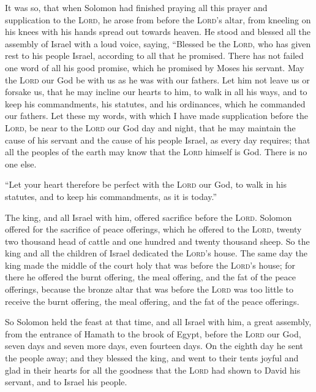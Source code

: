  It was so, that when Solomon had finished praying all
this prayer and supplication to the \textsc{Lord}, he arose from before
the \textsc{Lord}'s altar, from kneeling on his knees with his hands
spread out towards heaven.  He stood and blessed all the
assembly of Israel with a loud voice, saying,  ``Blessed
be the \textsc{Lord}, who has given rest to his people Israel, according
to all that he promised. There has not failed one word of all his good
promise, which he promised by Moses his servant.  May the
\textsc{Lord} our God be with us as he was with our fathers. Let him not
leave us or forsake us,  that he may incline our hearts
to him, to walk in all his ways, and to keep his commandments, his
statutes, and his ordinances, which he commanded our fathers.
 Let these my words, with which I have made supplication
before the \textsc{Lord}, be near to the \textsc{Lord} our God day and
night, that he may maintain the cause of his servant and the cause of
his people Israel, as every day requires;  that all the
peoples of the earth may know that the \textsc{Lord} himself is God.
There is no one else.

 ``Let your heart therefore be perfect with the
\textsc{Lord} our God, to walk in his statutes, and to keep his
commandments, as it is today.''

 The king, and all Israel with him, offered sacrifice
before the \textsc{Lord}.  Solomon offered for the
sacrifice of peace offerings, which he offered to the \textsc{Lord},
twenty two thousand head of cattle and one hundred and twenty thousand
sheep. So the king and all the children of Israel dedicated the
\textsc{Lord}'s house.  The same day the king made the
middle of the court holy that was before the \textsc{Lord}'s house; for
there he offered the burnt offering, the meal offering, and the fat of
the peace offerings, because the bronze altar that was before the
\textsc{Lord} was too little to receive the burnt offering, the meal
offering, and the fat of the peace offerings.

 So Solomon held the feast at that time, and all Israel
with him, a great assembly, from the entrance of Hamath to the brook of
Egypt, before the \textsc{Lord} our God, seven days and seven more days,
even fourteen days.  On the eighth day he sent the people
away; and they blessed the king, and went to their tents joyful and glad
in their hearts for all the goodness that the \textsc{Lord} had shown to
David his servant, and to Israel his people.


